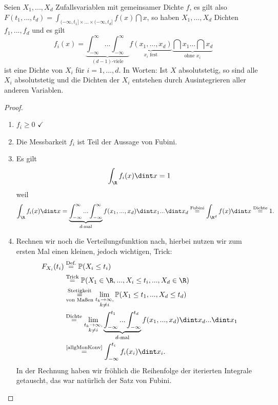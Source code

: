 \begin{prop}\label{p4}
	Seien $X_1,...,X_d$ Zufallsvariablen mit gemeinsamer Dichte $f$, es gilt also $ F(t_1,...,t_d) = \int_{(-\infty,t_1]\times ... \times (-\infty, t_d]} f(x)\dint x$, so haben $X_1,...,X_d$ Dichten $f_1,...,f_d$ und es gilt \[ f_i(x) = \underbrace{\int_{-\infty}^{\infty} ... \int_{-\infty}^{\infty}}_{(d-1)\text{-viele}} \underbrace{f(x_1,...,x_d)}_{x_i \text{ fest}} \underbrace{\dint x_1 ... \dint x_d}_{\text{ohne } x_i} \] ist eine Dichte von $X_i$ für $i=1,...,d$. In Worten: Ist $X$ absolutstetig, so sind alle $X_i$ absolutstetig und die Dichten der $X_i$ entstehen durch Ausintegrieren aller anderen Variablen.
\end{prop}

\begin{proof}\abs
	\begin{enumerate}[label=(\roman*)]
		\item $f_i \geq 0$ $\checkmark$ 
		\item Die Messbarkeit $f_i$ ist Teil der Aussage von Fubini.
		\item Es gilt  \[ \int_{\R} f_i(x) \dint x = 1 \] weil
		\[\int_{\R} f_i(x) \dint x = \underbrace{\int_{-\infty}^{\infty} ... \int_{-\infty}^{\infty}}_{d\text{-mal}} f(x_1,...,x_d) \dint x_1 ... \dint x_d \overset{\text{Fubini}}{=} \int_{\R^d} f(x) \dint x \overset{\text{Dichte}}{=} 1.  \]
		\item Rechnen wir noch die Verteilungsfunktion nach, hierbei nutzen wir zum ersten Mal einen kleinen, jedoch wichtigen, Trick:		
		\begin{align*}
			F_{X_i}(t_i) &\overset{\text{Def.}}{=} \mathbb{P}(X_i \leq t_i)\\
			& \overset{\text{Trick}}{=} \mathbb{P}(X_1 \in \R, ... , X_i \leq t_i, ..., X_d \in \R) \\
			&\overset{\text{Stetigkeit}}{\underset{\text{von Maßen}}{=}} \lim\limits_{\substack{t_k \to \infty, \\ k \neq i}} \mathbb{P}(X_1 \leq t_1,...,X_d \leq t_d)\\
			& \overset{\text{Dichte}}{=} \lim\limits_{\substack{t_k \to \infty, \\ k \neq i}} \underbrace{\int_{-\infty}^{t_1} ... \int_{-\infty}^{t_d}}_{d\text{-mal}} f(x_1,...,x_d) \dint x_d ... \dint x_1 \\
			&\overset{\text{\ref{allgMonKonv}}}{=} \int_{-\infty}^{t_i} f_i(x_i) \dint x_i.
		\end{align*}
		In der Rechnung haben wir fr\"ohlich die Reihenfolge der iterierten Integrale getauscht, das war nat\"urlich der Satz von Fubini.
	\end{enumerate}
\end{proof}
